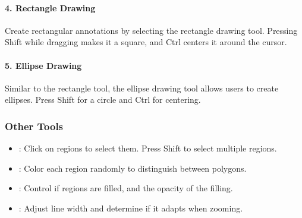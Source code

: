 \documentclass[letterpaper,10pt,english,openany,oneside]{sphinxmanual}
\begin{document}
\paragraph{4. Rectangle Drawing}
\label{\detokenize{docs/starting/regions:rectangle-drawing}}
\sphinxAtStartPar
Create rectangular annotations by selecting the rectangle drawing tool. Pressing Shift while dragging makes it a square, and Ctrl centers it around the cursor.


\paragraph{5. Ellipse Drawing}
\label{\detokenize{docs/starting/regions:ellipse-drawing}}
\sphinxAtStartPar
Similar to the rectangle tool, the ellipse drawing tool allows users to create ellipses. Press Shift for a circle and Ctrl for centering.


\subsubsection{Other Tools}
\label{\detokenize{docs/starting/regions:other-tools}}\begin{itemize}
\item {} 
\sphinxAtStartPar
{}: Click on regions to select them. Press Shift to select multiple regions.

\item {} 
\sphinxAtStartPar
{}: Color each region randomly to distinguish between polygons.

\item {} 
\sphinxAtStartPar
{}: Control if regions are filled, and the opacity of the filling.

\item {} 
\sphinxAtStartPar
{}: Adjust line width and determine if it adapts when zooming.

\end{itemize}
\end{document}
